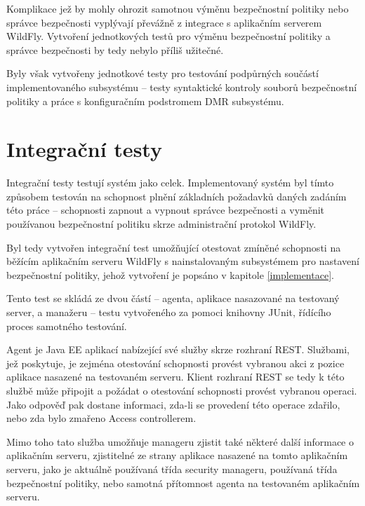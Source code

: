 Komplikace jež by mohly ohrozit samotnou výměnu bezpečnostní politiky nebo správce bezpečnosti vyplývají převážně z integrace s aplikačním serverem WildFly. Vytvoření jednotkových testů pro výměnu bezpečnostní politiky a správce bezpečnosti by tedy nebylo příliš užitečné.

Byly však vytvořeny jednotkové testy pro testování podpůrných součástí implementovaného subsystému -- testy syntaktické kontroly souborů bezpečnostní politiky a práce s konfiguračním podstromem DMR subsystému.

\section{Integrační testy}

Integrační testy testují systém jako celek. Implementovaný systém byl tímto způsobem testován na schopnost plnění základních požadavků daných zadáním této práce -- schopnosti zapnout a vypnout správce bezpečnosti a vyměnit používanou bezpečnostní politiku skrze administrační protokol WildFly.

Byl tedy vytvořen integrační test umožňující otestovat zmíněné schopnosti na běžícím aplikačním serveru WildFly s nainstalovaným subsystémem pro nastavení bezpečnostní politiky, jehož vytvoření je popsáno v kapitole \ref{implementace}.

Tento test se skládá ze dvou částí -- agenta, aplikace nasazované na testovaný server, a manažeru -- testu vytvořeného za pomoci knihovny JUnit, řídícího proces samotného testování.

Agent je Java EE aplikací nabízející své služby skrze rozhraní REST. Službami, jež poskytuje, je zejména otestování schopnosti provést vybranou akci z pozice aplikace nasazené na testovaném serveru. Klient rozhraní REST se tedy k této službě může připojit a požádat o otestování schopnosti provést vybranou operaci. Jako odpověď pak dostane informaci, zda-li se provedení této operace zdařilo, nebo zda bylo zmařeno Access controllerem.

Mimo toho tato služba umožňuje manageru zjistit také některé další informace o aplikačním serveru, zjistitelné ze strany aplikace nasazené na tomto aplikačním serveru, jako je aktuálně používaná třída security manageru, používaná třída bezpečnostní politiky, nebo samotná přítomnost agenta na testovaném aplikačním serveru.

